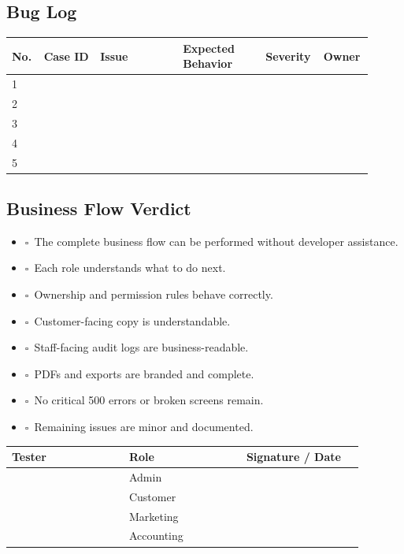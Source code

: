 \documentclass[11pt,a4paper]{article}
\newcommand{\checkbox}{\(\square\)}
\begin{document}
\subsection{Bug Log}
\begin{longtable}{p{0.08\linewidth}p{0.15\linewidth}p{0.22\linewidth}p{0.22\linewidth}p{0.12\linewidth}p{0.12\linewidth}}
\toprule
\textbf{No.} & \textbf{Case ID} & \textbf{Issue} & \textbf{Expected Behavior} & \textbf{Severity} & \textbf{Owner} \\
\midrule
1 & & & & & \\
2 & & & & & \\
3 & & & & & \\
4 & & & & & \\
5 & & & & & \\
\bottomrule
\end{longtable}

\subsection{Business Flow Verdict}
\begin{itemize}
  \item \checkbox\ The complete business flow can be performed without developer assistance.
  \item \checkbox\ Each role understands what to do next.
  \item \checkbox\ Ownership and permission rules behave correctly.
  \item \checkbox\ Customer-facing copy is understandable.
  \item \checkbox\ Staff-facing audit logs are business-readable.
  \item \checkbox\ PDFs and exports are branded and complete.
  \item \checkbox\ No critical 500 errors or broken screens remain.
  \item \checkbox\ Remaining issues are minor and documented.
\end{itemize}

\vspace{1cm}
\begin{longtable}{p{0.3\linewidth}p{0.3\linewidth}p{0.3\linewidth}}
\toprule
\textbf{Tester} & \textbf{Role} & \textbf{Signature / Date} \\
\midrule
 & Admin & \\
 & Customer & \\
 & Marketing & \\
 & Accounting & \\
\bottomrule
\end{longtable}
\end{document}
